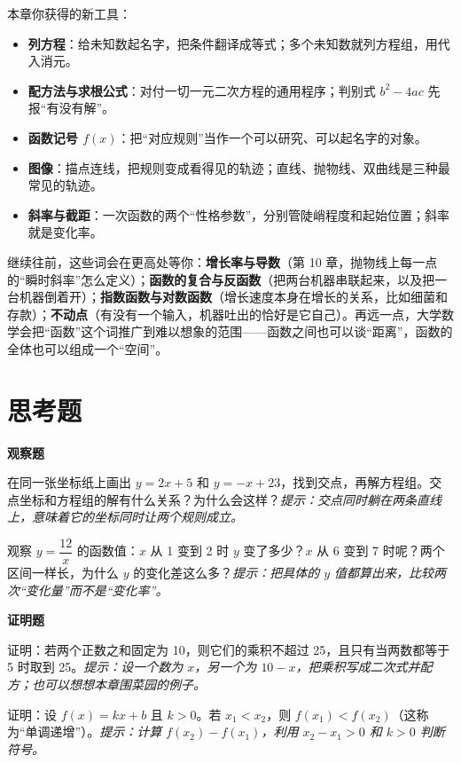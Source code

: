 \begin{toolbox}
本章你获得的新工具：
\begin{itemize}
\item \textbf{列方程}：给未知数起名字，把条件翻译成等式；多个未知数就列方程组，用代入消元。
\item \textbf{配方法与求根公式}：对付一切一元二次方程的通用程序；判别式 $b^2 - 4ac$ 先报“有没有解”。
\item \textbf{函数记号 $f(x)$}：把“对应规则”当作一个可以研究、可以起名字的对象。
\item \textbf{图像}：描点连线，把规则变成看得见的轨迹；直线、抛物线、双曲线是三种最常见的轨迹。
\item \textbf{斜率与截距}：一次函数的两个“性格参数”，分别管陡峭程度和起始位置；斜率就是变化率。
\end{itemize}
\end{toolbox}

\begin{pandeng}
继续往前，这些词会在更高处等你：\textbf{增长率与导数}（第 10 章，抛物线上每一点的“瞬时斜率”怎么定义）；\textbf{函数的复合与反函数}（把两台机器串联起来，以及把一台机器倒着开）；\textbf{指数函数与对数函数}（增长速度本身在增长的关系，比如细菌和存款）；\textbf{不动点}（有没有一个输入，机器吐出的恰好是它自己）。再远一点，大学数学会把“函数”这个词推广到难以想象的范围——函数之间也可以谈“距离”，函数的全体也可以组成一个“空间”。
\end{pandeng}

\section*{思考题}

\textbf{观察题}
\begin{sikao}
\item 在同一张坐标纸上画出 $y = 2x + 5$ 和 $y = -x + 23$，找到交点，再解方程组。交点坐标和方程组的解有什么关系？为什么会这样？\emph{提示：交点同时躺在两条直线上，意味着它的坐标同时让两个规则成立。}
\item 观察 $y = \dfrac{12}{x}$ 的函数值：$x$ 从 1 变到 2 时 $y$ 变了多少？$x$ 从 6 变到 7 时呢？两个区间一样长，为什么 $y$ 的变化差这么多？\emph{提示：把具体的 $y$ 值都算出来，比较两次“变化量”而不是“变化率”。}
\end{sikao}

\textbf{证明题}
\begin{sikao}
\item 证明：若两个正数之和固定为 10，则它们的乘积不超过 25，且只有当两数都等于 5 时取到 25。\emph{提示：设一个数为 $x$，另一个为 $10 - x$，把乘积写成二次式并配方；也可以想想本章围菜园的例子。}
\item 证明：设 $f(x) = kx + b$ 且 $k > 0$。若 $x_1 < x_2$，则 $f(x_1) < f(x_2)$（这称为“单调递增”）。\emph{提示：计算 $f(x_2) - f(x_1)$，利用 $x_2 - x_1 > 0$ 和 $k > 0$ 判断符号。}
\end{sikao}

